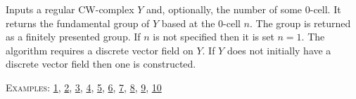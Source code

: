 \documentclass[a4paper,11pt]{report}
\begin{document}
{{{ 

 Inputs a regular CW-complex $Y$ and, optionally, the number of some 0-cell. It returns the fundamental group
of $Y$ based at the 0-cell $n$. The group is returned as a finitely presented group. If $n$ is not specified then it is set $n=1$. The algorithm requires a discrete vector field on $Y$. If $Y$ does not initially have a discrete vector field then one is constructed. 

\textsc{Examples:} \href{tutorial/chap1.html} {1}{\nobreakspace}, \href{tutorial/chap2.html} {2}{\nobreakspace}, \href{tutorial/chap3.html} {3}{\nobreakspace}, \href{../www/SideLinks/About/aboutLinks.html} {4}{\nobreakspace}, \href{../www/SideLinks/About/aboutPeripheral.html} {5}{\nobreakspace}, \href{../www/SideLinks/About/aboutCoveringSpaces.html} {6}{\nobreakspace}, \href{../www/SideLinks/About/aboutCoverinSpaces.html} {7}{\nobreakspace}, \href{../www/SideLinks/About/aboutQuandles.html} {8}{\nobreakspace}, \href{../www/SideLinks/About/aboutRandomComplexes.html} {9}{\nobreakspace}, \href{../www/SideLinks/About/aboutKnots.html} {10}{\nobreakspace} }

 }

 }

 
\end{document}
